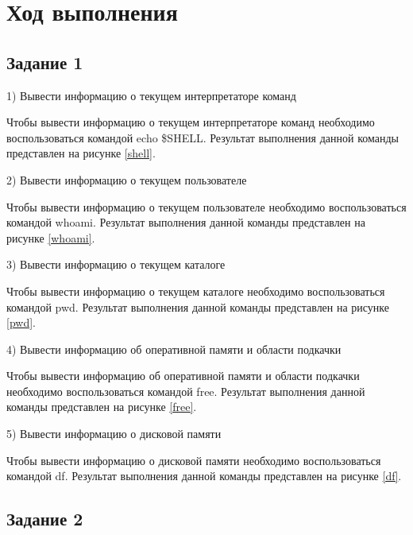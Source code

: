 \section{Ход выполнения}
\subsection{Задание 1}

1) Вывести информацию о текущем интерпретаторе команд

Чтобы вывести информацию о текущем интерпретаторе команд необходимо воспользоваться командой echo \$SHELL. Результат выполнения данной команды представлен на рисунке \ref{shell}.


2) Вывести информацию о текущем пользователе 

Чтобы вывести информацию о текущем пользователе необходимо воспользоваться командой whoami. Результат выполнения данной команды представлен на рисунке \ref{whoami}.


3) Вывести информацию о текущем каталоге

Чтобы вывести информацию о текущем каталоге необходимо воспользоваться командой pwd. Результат выполнения данной команды представлен на рисунке \ref{pwd}.


4) Вывести информацию об оперативной памяти и области подкачки

Чтобы вывести информацию об оперативной памяти и области подкачки необходимо воспользоваться командой free. Результат выполнения данной команды представлен на рисунке \ref{free}.


5) Вывести информацию о дисковой памяти

Чтобы вывести информацию о дисковой памяти необходимо воспользоваться командой df. Результат выполнения данной команды представлен на рисунке \ref{df}.


\subsection{Задание 2}

